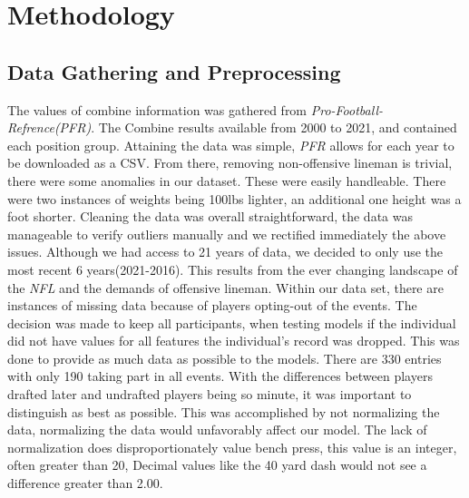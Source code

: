 \documentclass[confrence]{IEEEtran}
\begin{document}
\section*{Methodology}
\subsection*{Data Gathering and Preprocessing}
The values of combine information was gathered from \textit{Pro-Football-Refrence(PFR)}.
The Combine results available from 2000 to 2021, and contained each position group.
Attaining the data was simple, \textit{PFR} allows for each year to be downloaded as a CSV.
From there, removing non-offensive lineman is trivial, there were some anomalies in our dataset.
These were easily handleable. There were two instances of weights being 100lbs lighter, an additional one height was a foot shorter.
Cleaning the data was overall straightforward, the data was manageable to verify outliers manually and we rectified immediately the above issues.
Although we had access to 21 years of data, we decided to only use the most recent 6 years(2021-2016). This results from the ever changing landscape of the \textit{NFL} and the demands of offensive lineman.
Within our data set, there are instances of missing data because of players opting-out of the events.
The decision was made to keep all participants, when testing models if the individual did not have values for all features the individual's record was dropped.
This was done to provide as much data as possible to the models. There are 330 entries with only 190 taking part in all events.
With the differences between players drafted later and undrafted players being so minute, it was important to distinguish as best as possible.
This was accomplished by not normalizing the data, normalizing the data would unfavorably affect our model.
The lack of normalization does disproportionately value bench press, this value is an integer, often greater than 20, Decimal values like the 40 yard dash would not see a difference greater than 2.00.
\end{document}
